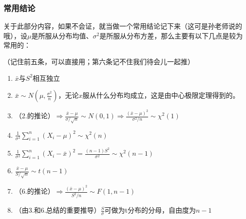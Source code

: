 \documentclass[10pt, a4paper]{article}
\begin{document}
\subsubsection{常用结论}
关于此部分内容，如果不会证，就当做一个常用结论记下来（这可是孙老师说的哦），设$\mu$是所服从分布均值、$\sigma^2$是所服从分布方差，那么主要有以下几点是较为常用的：\par
（记住前五条，可以直接用；第六条记不住我们待会儿一起推）
\begin{enumerate}
    \item $\bar{x}$与$S^2$相互独立
    \item $\bar{x}\sim N(\mu, \frac{\sigma^2}{n})$，无论$x$服从什么分布均成立，这是由中心极限定理得到的。
    \item （2.的推论）$\Rightarrow \frac{\bar x - \mu}{\sigma/\sqrt n} \sim N(0, 1)\Rightarrow \frac{(\bar x - \mu)^2}{\sigma^2/ n} \sim \chi^2(1)$
    \item $\frac{1}{\sigma^2}\sum_{i=1}^{n}(X_i - \mu)^2  \sim \chi^2(n)$
    \item $\frac{1}{\sigma^2}\sum_{i=1}^{n}(X_i - \bar x)^2  =\frac{(n-1)S^2}{\sigma^2}\sim \chi^2(n-1)$
    \item $\frac{\bar x - \mu}{S/\sqrt n} \sim t(n-1)$
    \item （6.的推论）$\Rightarrow \frac{(\bar x - \mu)^2}{S^2/n} \sim F(1, n-1)$
    \item （由3.和6.总结的重要推导）$\frac{S}{\sigma}$可做为t分布的分母，自由度为$n-1$
\end{enumerate}
\end{document}
